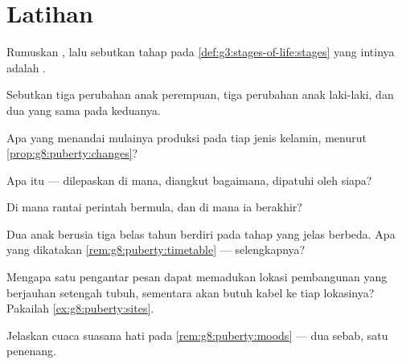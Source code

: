 \section{Latihan}

\begin{exercise}[$\star$]\label{exo:g8:puberty:1}
Rumuskan , lalu sebutkan tahap pada
\cref{def:g3:stages-of-life:stages} yang intinya adalah .
\end{exercise}

\begin{exercise}[$\star$]\label{exo:g8:puberty:2}
Sebutkan tiga perubahan  anak perempuan, tiga
perubahan anak laki-laki, dan dua yang sama pada keduanya.
\end{exercise}

\begin{exercise}[$\star$]\label{exo:g8:puberty:3}
Apa yang menandai mulainya produksi  pada tiap jenis
kelamin, menurut \cref{prop:g8:puberty:changes}?
\end{exercise}

\begin{exercise}[$\star$]\label{exo:g8:puberty:4}
Apa itu  --- dilepaskan di mana, diangkut bagaimana,
dipatuhi oleh siapa?
\end{exercise}

\begin{exercise}[$\star$]\label{exo:g8:puberty:5}
Di mana rantai perintah  bermula, dan di mana ia
berakhir?
\end{exercise}

\begin{exercise}[$\star$]\label{exo:g8:puberty:6}
Dua anak berusia tiga belas tahun berdiri pada tahap yang
jelas berbeda. Apa yang dikatakan
\cref{rem:g8:puberty:timetable} --- selengkapnya?
\end{exercise}

\begin{exercise}[$\star\star$]\label{exo:g8:puberty:7}
Mengapa satu pengantar pesan dapat memadukan lokasi
pembangunan yang berjauhan setengah tubuh, sementara 
akan butuh kabel ke tiap lokasinya? Pakailah \cref{ex:g8:puberty:sites}.
\end{exercise}

\begin{exercise}[$\star\star$]\label{exo:g8:puberty:8}
Jelaskan cuaca suasana hati pada \cref{rem:g8:puberty:moods}
--- dua sebab, satu penenang.
\end{exercise}

